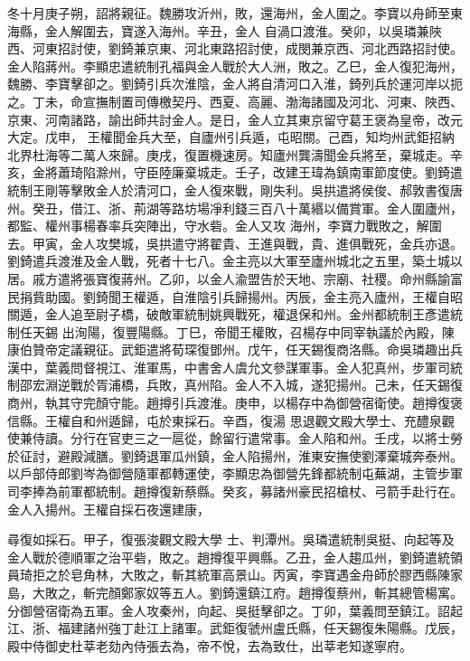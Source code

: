 \begin{pinyinscope}
 冬十月庚子朔，詔將親征。魏勝攻沂州，敗，還海州，金人圍之。李寶以舟師至東海縣，金人解圍去，寶遂入海州。辛丑，金人
 自渦口渡淮。癸卯，以吳璘兼陜西、河東招討使，劉錡兼京東、河北東路招討使，成閔兼京西、河北西路招討使。金人陷蔣州。李顯忠遣統制孔福與金人戰於大人洲，敗之。乙巳，金人復犯海州，魏勝、李寶擊卻之。劉錡引兵次淮陰，金人將自清河口入淮，錡列兵於運河岸以扼之。丁未，命宣撫制置司傳檄契丹、西夏、高麗、渤海諸國及河北、河東、陜西、京東、河南諸路，諭出師共討金人。是日，金人立其東京留守葛王褒為皇帝，改元大定。戊申，
 王權聞金兵大至，自廬州引兵遁，屯昭關。己酉，知均州武鉅招納北界杜海等二萬人來歸。庚戌，復置機速房。知廬州龔濤聞金兵將至，棄城走。辛亥，金將蕭琦陷滁州，守臣陸廉棄城走。壬子，改建王瑋為鎮南軍節度使。劉錡遣統制王剛等擊敗金人於清河口，金人復來戰，剛失利。吳拱遣將侯俊、郝敦書復唐州。癸丑，借江、浙、荊湖等路坊場凈利錢三百八十萬緡以備賞軍。金人圍廬州，都監、權州事楊春率兵突陣出，守水砦。金人又攻
 海州，李寶力戰敗之，解圍去。甲寅，金人攻樊城，吳拱遣守將翟貴、王進與戰，貴、進俱戰死，金兵亦退。劉錡遣兵渡淮及金人戰，死者十七八。金主亮以大軍至廬州城北之五里，築土城以居。戚方遣將張寶復蔣州。乙卯，以金人渝盟告於天地、宗廟、社稷。命州縣諭富民捐貲助國。劉錡聞王權遁，自淮陰引兵歸揚州。丙辰，金主亮入廬州，王權自昭關遁，金人追至尉子橋，破敵軍統制姚興戰死，權退保和州。金州都統制王彥遣統制任天錫
 出洵陽，復豐陽縣。丁巳，帝聞王權敗，召楊存中同宰執議於內殿，陳康伯贊帝定議親征。武鉅遣將荀琛復鄧州。戊午，任天錫復商洛縣。命吳璘趣出兵漢中，葉義問督視江、淮軍馬，中書舍人虞允文參謀軍事。金人犯真州，步軍司統制邵宏淵逆戰於胥浦橋，兵敗，真州陷。金人不入城，遂犯揚州。己未，任天錫復商州，執其守完顏守能。趙撙引兵渡淮。庚申，以楊存中為御營宿衛使。趙撙復褒信縣。王權自和州遁歸，屯於東採石。辛酉，復湯
 思退觀文殿大學士、充醴泉觀使兼侍讀。分行在官吏三之一扈從，餘留行遣常事。金人陷和州。壬戌，以將士勞於征討，避殿減膳。劉錡退軍瓜州鎮，金人陷揚州，淮東安撫使劉澤棄城奔泰州。以戶部侍郎劉岑為御營隨軍都轉運使，李顯忠為御營先鋒都統制屯蕪湖，主管步軍司李捧為前軍都統制。趙撙復新蔡縣。癸亥，募諸州豪民招槍杖、弓箭手赴行在。金人入揚州。王權自採石夜還建康，



 尋復如採石。甲子，復張浚觀文殿大學
 士、判潭州。吳璘遣統制吳挺、向起等及金人戰於德順軍之治平砦，敗之。趙撙復平興縣。乙丑，金人趨瓜州，劉錡遣統領員琦拒之於皂角林，大敗之，斬其統軍高景山。丙寅，李寶遇金舟師於膠西縣陳家島，大敗之，斬完顏鄭家奴等五人。劉錡還鎮江府。趙撙復蔡州，斬其總管楊寓。分御營宿衛為五軍。金人攻秦州，向起、吳挺擊卻之。丁卯，葉義問至鎮江。詔起江、浙、福建諸州強丁赴江上諸軍。武鉅復虢州盧氏縣，任天錫復朱陽縣。戊辰，
 殿中侍御史杜莘老劾內侍張去為，帝不悅，去為致仕，出莘老知遂寧府。




\end{pinyinscope}
